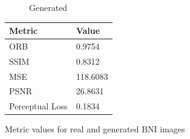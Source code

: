 \documentclass[12pt,DIV14,BCOR12mm,a4paper,footinclude=false,headinclude,parskip=half-,twoside,openright,cleardoublepage=empty,toc=index,bibliography=totoc,listof=totoc]{scrreprt}
\numberwithin{equation}{chapter}
\begin{document}
\begin{figure}
\begin{minipage}[H]{\linewidth}
\begin{minipage}[H]{0.5\linewidth}
\begin{subfigure}[t]{0.48\linewidth}
                \caption{Generated}
            \end{subfigure}
        \end{minipage}%
        \hfill
        \begin{minipage}[H]{0.5\linewidth} %
            \centering
            \small
            \begin{tabular}{p{3cm} p{2cm}}
                \toprule
                \textbf{Metric} & \textbf{Value} \\
                \midrule
                ORB             & 0.9754        \\
                SSIM            & 0.8312        \\
                MSE             & 118.6083      \\
                PSNR            & 26.8631       \\
                Perceptual Loss & 0.1834        \\
                \bottomrule
            \end{tabular}
        \end{minipage}%
        \caption{Metric values for real and generated BNI images}
        \label{fig:comparison_real_generated_1_1_bni}
    \end{minipage}
\end{figure}
\end{document}
